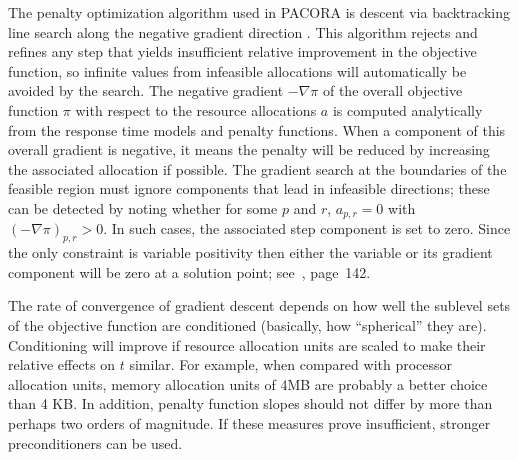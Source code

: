 The penalty optimization algorithm used in PACORA is descent via backtracking line search along the negative gradient direction \cite{BoVa}.
This algorithm rejects and refines any step that yields insufficient relative improvement in the objective function,
so infinite values from infeasible allocations will automatically be avoided by the search.
The negative gradient $-\nabla\pi$ of the overall objective function $\pi$
with respect to the resource allocations $a$
is computed analytically from the response time models and penalty functions.
When a component of this overall gradient is negative,
it means the penalty will be reduced by increasing the associated allocation if possible.
The gradient search at the boundaries of the feasible region
must ignore components that lead in infeasible directions;
these can be detected by noting whether for some $p$ and $r$, $a_{p,r} = 0$ with $(-\nabla\pi)_{p,r} > 0$.
In such cases, the associated step component is set to zero.
Since the only constraint is variable positivity
then either the variable or its gradient component will be zero at a solution point; see~\cite{BoVa}, page~142.

The rate of convergence of gradient descent depends on how well the sublevel sets of the objective function
are conditioned (basically, how “spherical” they are).
Conditioning will improve if resource allocation units are scaled to make their relative effects on $t$ similar.
For example, when compared with processor allocation units,
memory allocation units of 4MB are probably a better choice than 4 KB.
In addition, penalty function slopes should not differ by more than perhaps two orders of magnitude.
If these measures prove insufficient, stronger preconditioners can be used.
